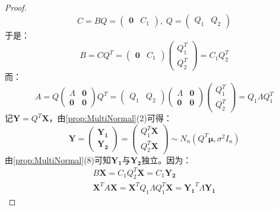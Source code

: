 \begin{proof}
	\begin{equation*}
		C=BQ=
		\begin{pmatrix}
			\mathbf{0} & C_1
		\end{pmatrix},\;
		Q=
		\begin{pmatrix}
			Q_1 & Q_2
		\end{pmatrix}
	\end{equation*}
	于是：
	\begin{equation*}
		B=CQ^T=
		\begin{pmatrix}
			\mathbf{0} & C_1
		\end{pmatrix}
		\begin{pmatrix}
			Q_1^T \\
			Q_2^T
		\end{pmatrix}
		=C_1Q_2^T
	\end{equation*}
	而：
	\begin{equation*}
		A=Q
		\begin{pmatrix}
			\varLambda & \mathbf{0} \\
			\mathbf{0} & \mathbf{0}
		\end{pmatrix}
		Q^T
		=
		\begin{pmatrix}
			Q_1 & Q_2
		\end{pmatrix}
		\begin{pmatrix}
			\varLambda & \mathbf{0} \\
			\mathbf{0} & \mathbf{0}
		\end{pmatrix}
		\begin{pmatrix}
			Q_1^T \\
			Q_2^T
		\end{pmatrix}
		=Q_1\varLambda Q_1^T
	\end{equation*}
	记$\mathbf{Y}=Q^T\mathbf{X}$，由\cref{prop:MultiNormal}(2)可得：
	\begin{equation*}
		\mathbf{Y}=
		\begin{pmatrix}
			\mathbf{Y_1} \\
			\mathbf{Y_2}
		\end{pmatrix}
		=
		\begin{pmatrix}
			Q_1^T\mathbf{X} \\
			Q_2^T\mathbf{X}
		\end{pmatrix}
		\sim N_n(Q^T\boldsymbol{\mu},\sigma^2I_n)
	\end{equation*}
	由\cref{prop:MultiNormal}(8)可知$\mathbf{Y_1}$与$\mathbf{Y_2}$独立。因为：
	\begin{gather*}
		B\mathbf{X}=C_1Q_2^T\mathbf{X}=C_1\mathbf{Y_2} \\
		\mathbf{X}^TA\mathbf{X}=\mathbf{X}^TQ_1\varLambda Q_1^T\mathbf{X}=\mathbf{Y_1}^T\varLambda\mathbf{Y_1}

\end{gather*}
\end{proof}
